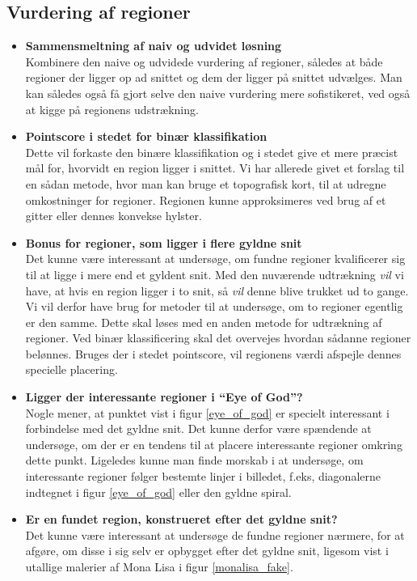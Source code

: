 {\subsection{Vurdering af regioner}
\begin{itemize}
    \item \textbf{Sammensmeltning af naiv og udvidet løsning}\\
        Kombinere den naive og udvidede vurdering af regioner, således
        at både regioner der ligger op ad snittet og dem der ligger på
        snittet udvælges. Man kan således også få gjort selve den naive
        vurdering mere sofistikeret, ved også at kigge på regionens
        udstrækning.
    \item \textbf{Pointscore i stedet for binær klassifikation}\\
        Dette vil forkaste den binære klassifikation og i stedet give et
        mere præcist mål for, hvorvidt en region ligger i snittet.  Vi
        har allerede givet et forslag til en sådan metode, hvor man kan
        bruge et topografisk kort, til at udregne omkostninger for
        regioner.  Regionen kunne approksimeres ved brug af et gitter
        eller dennes konvekse hylster.
    \item \textbf{Bonus for regioner, som ligger i flere gyldne snit}\\
        Det kunne være interessant at undersøge, om fundne regioner
        kvalificerer sig til at ligge i mere end et gyldent snit. Med
        den nuværende udtrækning \emph{vil} vi have, at hvis en region
        ligger i to snit, så \emph{vil} denne blive trukket ud to gange.
        Vi vil derfor have brug for metoder til at undersøge, om to
        regioner egentlig er den samme. Dette skal løses med en anden
        metode for udtrækning af regioner. Ved binær klassificering skal
        det overvejes hvordan sådanne regioner belønnes. Bruges der i
        stedet pointscore, vil regionens værdi afspejle dennes specielle
        placering.
    \item \textbf{Ligger der interessante regioner i ``Eye of God''?}\\
        Nogle mener, at punktet vist i figur \ref{eye_of_god} er
        specielt interessant i forbindelse med det gyldne snit. Det
        kunne derfor være spændende at undersøge, om der er en tendens
        til at placere interessante regioner omkring dette punkt.
        Ligeledes kunne man finde morskab i at undersøge, om
        interessante regioner følger bestemte linjer i billedet, f.eks,
        diagonalerne indtegnet i figur \ref{eye_of_god} eller den gyldne
        spiral.
    \item \textbf{Er en fundet region, konstrueret efter det gyldne snit?}\\
        Det kunne være interessant at undersøge de fundne regioner
        nærmere, for at afgøre, om disse i sig selv er opbygget efter
        det gyldne snit, ligesom vist i utallige malerier af Mona Lisa i
        figur \ref{monalisa_fake}.
\end{itemize}

}
